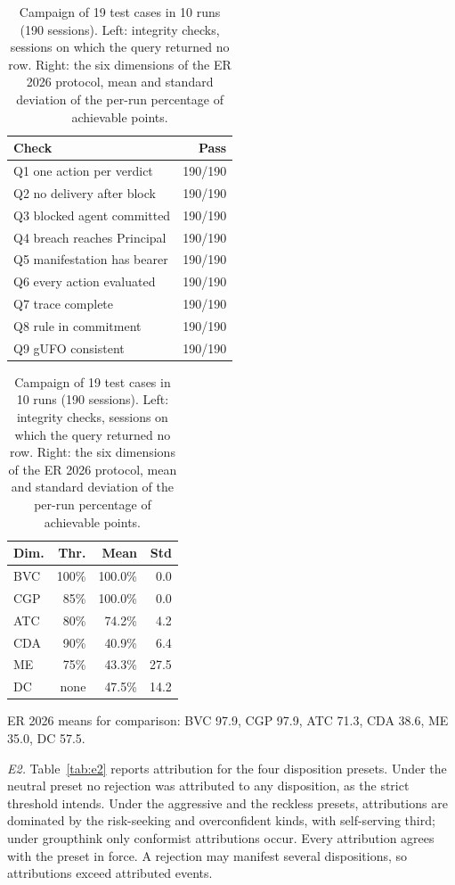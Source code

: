 \documentclass[runningheads]{llncs}
\begin{document}
\begin{table}[tb]
\centering
\caption{Campaign of 19 test cases in 10 runs (190 sessions). Left: integrity checks, sessions on which the query returned no row. Right: the six dimensions of the ER 2026 protocol, mean and standard deviation of the per-run percentage of achievable points.}
\label{tab:results}
\begin{minipage}[t]{0.46\textwidth}
\centering
\begin{tabular}{@{}lr@{}}
\toprule
\textbf{Check} & \textbf{Pass} \\
\midrule
Q1 one action per verdict & 190/190 \\
Q2 no delivery after block & 190/190 \\
Q3 blocked agent committed & 190/190 \\
Q4 breach reaches Principal & 190/190 \\
Q5 manifestation has bearer & 190/190 \\
Q6 every action evaluated & 190/190 \\
Q7 trace complete & 190/190 \\
Q8 rule in commitment & 190/190 \\
Q9 gUFO consistent & 190/190 \\
\bottomrule
\end{tabular}
\end{minipage}\hfill
\begin{minipage}[t]{0.50\textwidth}
\centering
\begin{tabular}{@{}lrrr@{}}
\toprule
\textbf{Dim.} & \textbf{Thr.} & \textbf{Mean} & \textbf{Std} \\
\midrule
BVC & 100\% & 100.0\% & 0.0 \\
CGP & 85\% & 100.0\% & 0.0 \\
ATC & 80\% & 74.2\% & 4.2 \\
CDA & 90\% & 40.9\% & 6.4 \\
ME & 75\% & 43.3\% & 27.5 \\
DC & none & 47.5\% & 14.2 \\
\bottomrule
\end{tabular}
\par\smallskip\footnotesize ER 2026 means for comparison: BVC 97.9, CGP 97.9, ATC 71.3, CDA 38.6, ME 35.0, DC 57.5.
\end{minipage}
\end{table}

\emph{E2.} Table~\ref{tab:e2} reports attribution for the four disposition presets. Under the neutral preset no rejection was attributed to any disposition, as the strict threshold intends. Under the aggressive and the reckless presets, attributions are dominated by the risk-seeking and overconfident kinds, with self-serving third; under groupthink only conformist attributions occur. Every attribution agrees with the preset in force. A rejection may manifest several dispositions, so attributions exceed attributed events.
\end{document}

